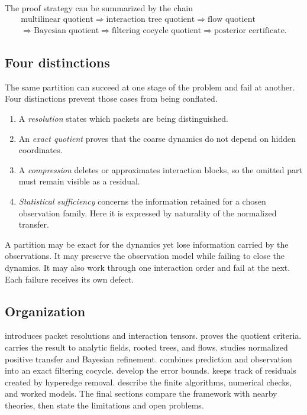 \documentclass[11pt]{article}
\theoremstyle{definition}
\theoremstyle{remark}
\begin{document}
The proof strategy can be summarized by the chain
\[
\boxed{
\begin{gathered}
  \text{multilinear quotient}
  \Longrightarrow
  \text{interaction tree quotient}
  \Longrightarrow
  \text{flow quotient}
  \\
  \Longrightarrow
  \text{Bayesian quotient}
  \Longrightarrow
  \text{filtering cocycle quotient}
  \Longrightarrow
  \text{posterior certificate}.
\end{gathered}}
\]

\subsection{Four distinctions}
The same partition can succeed at one stage of the problem and fail at another.  Four distinctions prevent those cases from being conflated.

\begin{enumerate}[label=(\roman*),leftmargin=2.5em]
\item A \emph{resolution} states which packets are being distinguished.
\item An \emph{exact quotient} proves that the coarse dynamics do not depend on hidden coordinates.
\item A \emph{compression} deletes or approximates interaction blocks, so the omitted part must remain visible as a residual.
\item \emph{Statistical sufficiency} concerns the information retained for a chosen observation family.  Here it is expressed by naturality of the normalized transfer.
\end{enumerate}

A partition may be exact for the dynamics yet lose information carried by the observations.  It may preserve the observation model while failing to close the dynamics.  It may also work through one interaction order and fail at the next.  Each failure receives its own defect.

\subsection{Organization}
 introduces packet resolutions and interaction tensors.   proves the quotient criteria.   carries the result to analytic fields, rooted trees, and flows.   studies normalized positive transfer and Bayesian refinement.   combines prediction and observation into an exact filtering cocycle.   develop the error bounds.   keeps track of residuals created by hyperedge removal.   describe the finite algorithms, numerical checks, and worked models.  The final sections compare the framework with nearby theories, then state the limitations and open problems.
\end{document}
